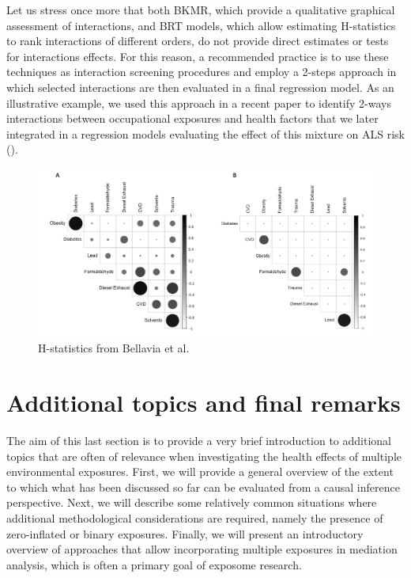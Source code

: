 \documentclass[
]{book}
\begin{document}
Let us stress once more that both BKMR, which provide a qualitative graphical assessment of interactions, and BRT models, which allow estimating H-statistics to rank interactions of different orders, do not provide direct estimates or tests for interactions effects. For this reason, a recommended practice is to use these techniques as interaction screening procedures and employ a 2-steps approach in which selected interactions are then evaluated in a final regression model. As an illustrative example, we used this approach in a recent paper to identify 2-ways interactions between occupational exposures and health factors that we later integrated in a regression models evaluating the effect of this mixture on ALS risk (\citet{bellavia2021joint}).

\begin{figure}
\centering
\includegraphics{images/hstats.png}
\caption{H-statistics from Bellavia et al.}
\end{figure}

\hypertarget{additional-topics-and-final-remarks}{%
\chapter{Additional topics and final remarks}\label{additional-topics-and-final-remarks}}

The aim of this last section is to provide a very brief introduction to additional topics that are often of relevance when investigating the health effects of multiple environmental exposures. First, we will provide a general overview of the extent to which what has been discussed so far can be evaluated from a causal inference perspective. Next, we will describe some relatively common situations where additional methodological considerations are required, namely the presence of zero-inflated or binary exposures. Finally, we will present an introductory overview of approaches that allow incorporating multiple exposures in mediation analysis, which is often a primary goal of exposome research.
\end{document}
